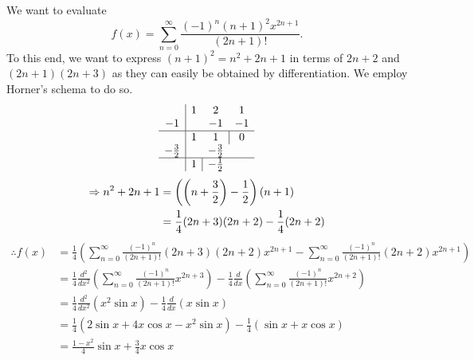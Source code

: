 \item

We want to evaluate
\[
	f(x) = \sum_{n = 0}^\infty \frac{{(-1)}^n {(n + 1)}^2 x^{2n + 1}}{(2n + 1)!}.
\]
To this end, we want to express ${(n + 1)}^2 = n^2 + 2n + 1$ in terms of $2n + 2$ and $(2n + 1)(2n + 3)$
as they can easily be obtained by differentiation.
We employ Horner's schema to do so.
\[
	\begin{array}{ c | c c c }
		             & 1 & 2                           & 1                      \\
		-1           &   & -1                          & -1                     \\
		\hline
		             & 1 & 1                           & \multicolumn{1}{|c}{0} \\
		-\frac{3}{2} &   & -\frac{3}{2}                &                        \\
		\hline
		             & 1 & \multicolumn{1}{|c}{-\half} &
	\end{array}
\]
\begin{align*}
	\Rightarrow n^2 + 2n + 1
	 & = \left( \left( n + \frac{3}{2} \right) - \frac{1}{2} \right) (n + 1) \\
	 & = \frac{1}{4} (2n + 3) (2n + 2) - \frac{1}{4} (2n + 2)
\end{align*}
\begin{align*}
	\therefore f(x)
	 & = \frac{1}{4} \left(
	\sum_{n = 0}^\infty \frac{{(-1)}^n}{(2n + 1)!} (2n + 3) (2n + 2) x^{2n + 1}
	- \sum_{n = 0}^\infty \frac{{(-1)}^n}{(2n + 1)!} (2n + 2) x^{2n + 1}
	\right)                                                                                                        \\
	 & = \frac{1}{4} \frac{d^2}{dx^2} \left( \sum_{n = 0}^\infty \frac{{(-1)}^n}{(2n + 1)!} x^{2n + 3} \right)
	-\frac{1}{4} \frac{d}{dx} \left( \sum_{n = 0}^\infty \frac{{(-1)}^n}{(2n + 1)!} x^{2n + 2} \right)             \\
	 & = \frac{1}{4} \frac{d^2}{dx^2} \left( x^2 \sin x \right) - \frac{1}{4} \frac{d}{dx} \left( x \sin x \right) \\
	 & = \frac{1}{4} \left( 2\sin x + 4x\cos x - x^2 \sin x \right) - \frac{1}{4} \left( \sin x + x \cos x \right) \\
	 & = \frac{1 - x^2}{4} \sin x + \frac{3}{4} x \cos x
\end{align*}